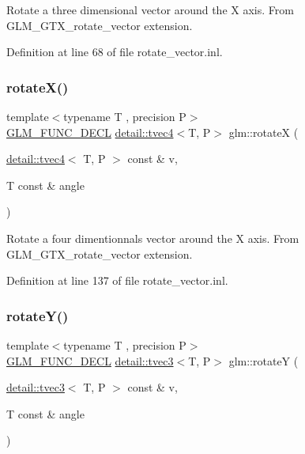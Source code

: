 Rotate a three dimensional vector around the X axis. From G\+L\+M\+\_\+\+G\+T\+X\+\_\+rotate\+\_\+vector extension. 

Definition at line 68 of file rotate\+\_\+vector.\+inl.

\mbox{\label{group__gtx__rotate__vector_gaa0db2d8b73f86d7bfdf2bface4056e88}} 
\subsubsection{\texorpdfstring{rotate\+X()}{rotateX()}\hspace{0.1cm}{\footnotesize\ttfamily [2/2]}}
{\footnotesize\ttfamily template$<$typename T , precision P$>$ \\
\hyperlink{setup_8hpp_ab2d052de21a70539923e9bcbf6e83a51}{G\+L\+M\+\_\+\+F\+U\+N\+C\+\_\+\+D\+E\+CL} \hyperlink{structglm_1_1detail_1_1tvec4}{detail\+::tvec4}$<$T, P$>$ glm\+::rotateX (\begin{DoxyParamCaption}\item[{\hyperlink{structglm_1_1detail_1_1tvec4}{detail\+::tvec4}$<$ T, P $>$ const \&}]{v,  }\item[{T const \&}]{angle }\end{DoxyParamCaption})}

Rotate a four dimentionnals vector around the X axis. From G\+L\+M\+\_\+\+G\+T\+X\+\_\+rotate\+\_\+vector extension. 

Definition at line 137 of file rotate\+\_\+vector.\+inl.

\mbox{\label{group__gtx__rotate__vector_gae1e673b7a464218ce6a5e8f02145f877}} 
\subsubsection{\texorpdfstring{rotate\+Y()}{rotateY()}\hspace{0.1cm}{\footnotesize\ttfamily [1/2]}}
{\footnotesize\ttfamily template$<$typename T , precision P$>$ \\
\hyperlink{setup_8hpp_ab2d052de21a70539923e9bcbf6e83a51}{G\+L\+M\+\_\+\+F\+U\+N\+C\+\_\+\+D\+E\+CL} \hyperlink{structglm_1_1detail_1_1tvec3}{detail\+::tvec3}$<$T, P$>$ glm\+::rotateY (\begin{DoxyParamCaption}\item[{\hyperlink{structglm_1_1detail_1_1tvec3}{detail\+::tvec3}$<$ T, P $>$ const \&}]{v,  }\item[{T const \&}]{angle }\end{DoxyParamCaption})}

